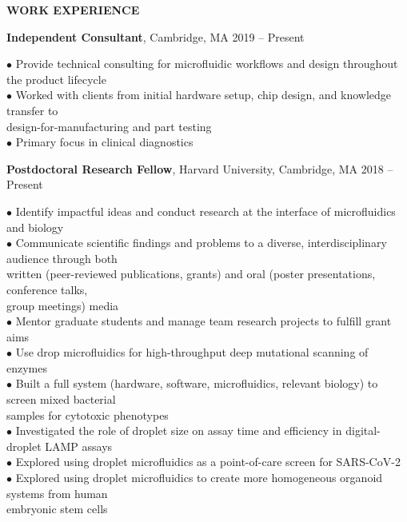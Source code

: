 \documentclass[10pt]{article}
\newenvironment{changemargin}[2]{%
  \list{}{\rightmargin#2\leftmargin#1
    \parsep=0pt\topsep=1pt\partopsep=0pt}
\item[]} {\endlist}
\newenvironment{indentmore}{\begin{changemargin}{10pt}{0cm}}{\end{changemargin}}
\begin{document}
\textbf{\large WORK EXPERIENCE}
\begin{indentmore}
{\bf Independent Consultant}, Cambridge, MA \hfill 2019 -- Present
\begin{indentmore}
$\bullet$ Provide technical consulting for microfluidic workflows and design throughout the product lifecycle\\
$\bullet$ Worked with clients from initial hardware setup, chip design, and knowledge transfer to\\ \hspace*{5pt} design-for-manufacturing and part testing\\
$\bullet$ Primary focus in clinical diagnostics\\
\end{indentmore}

{\bf Postdoctoral Research Fellow}, Harvard University, Cambridge, MA \hfill 2018 -- Present
\begin{indentmore}
$\bullet$ Identify impactful ideas and conduct research at the interface of microfluidics and biology\\
$\bullet$ Communicate scientific findings and problems to a diverse, interdisciplinary audience through both\\ \hspace*{5pt} written (peer-reviewed publications, grants) and oral (poster presentations, conference talks,\\ \hspace*{5pt} group meetings) media\\
$\bullet$ Mentor graduate students and manage team research projects to fulfill grant aims\\
$\bullet$ Use drop microfluidics for high-throughput deep mutational scanning of enzymes\\
$\bullet$ Built a full system (hardware, software, microfluidics, relevant biology) to screen mixed bacterial\\ \hspace*{5pt} samples for cytotoxic phenotypes\\
$\bullet$ Investigated the role of droplet size on assay time and efficiency in digital-droplet LAMP assays\\
$\bullet$ Explored using droplet microfluidics as a point-of-care screen for SARS-CoV-2\\
$\bullet$ Explored using droplet microfluidics to create more homogeneous organoid systems from human\\ \hspace*{5pt} embryonic stem cells\\
\end{indentmore}


\end{indentmore}
\end{document}
